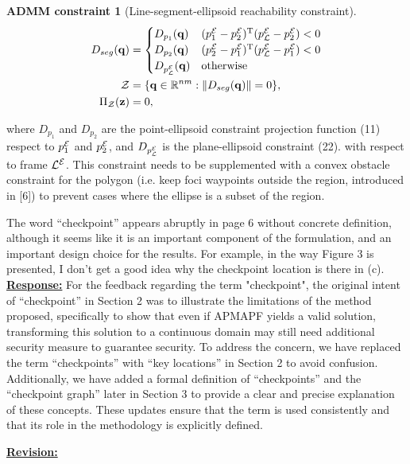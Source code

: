 \documentclass{article}
\newtheorem{constraint}{ADMM constraint}
\newcommand{\re}{\tcblower \underline{\textbf{Response:}}\quad}
\newcommand{\rv}{{\large{\underline{\textbf{Revision:}}}}\quad}
\begin{document}
{\begin{constraint}[Line-segment-ellipsoid reachability constraint]
\begin{align}
D_{seg}(\mathbf{q}) &=  \begin{cases}
D_{p_{1}}(\mathbf{q}) & ({p_1^{\mathcal{E}}}-{p_2^{\mathcal{E}}})^\mathrm{T} ({p_{\mathcal{L}}^{\mathcal{E}}}-{p_2^{\mathcal{E}}})<0\\
D_{p_{2}}(\mathbf{q}) & ({p_2^{\mathcal{E}}}-{p_1^{\mathcal{E}}})^\mathrm{T} ({p_{\mathcal{L}}^{\mathcal{E}}} -{p_1^{\mathcal{E}}})<0\\
D_{p_{\mathcal{L}}^{\mathcal{E}}}(\mathbf{q}) & \textrm{otherwise}
\end{cases} \label{eq:segment_ellipsoid_constraint}\\
  \mathcal{Z} &= \{\mathbf{q}\in\mathbb{R}^{nm}:\lVert D_{seg}(\mathbf{q})\rVert = 0 \},\\
   \Pi_{\mathcal{Z}}(\mathbf{z}) & = 0, 
\end{align}
\end{constraint}
where $D_{p_{1}}$ and $D_{p_{2}}$ are the point-ellipsoid constraint projection function (11) respect to ${p_{1}^{\mathcal{E}}}$ and ${p_{2}^{\mathcal{E}}}$, and $D_{p_{\mathcal{L}}^{\mathcal{E}}}$ is the plane-ellipsoid constraint (22). with respect to frame ${\mathcal{L}^{\mathcal{E}}}$.
This constraint needs to be supplemented with a convex obstacle constraint for the polygon (i.e. keep foci waypoints outside the region, introduced in [6]) to prevent cases where the ellipse is a subset of the region.
}

\vspace{0.2cm}
\begin{cmt}{}{}
	The word “checkpoint” appears abruptly in page 6 without concrete
	definition, although it seems like it is an important component of the
	formulation, and an important design choice for the results. For
	example, in the way Figure 3 is presented, I don't get a good idea why
	the checkpoint location is there in (c). 
	\re 
	\noindent
 For the feedback regarding the term "checkpoint", the original intent of “checkpoint” in Section 2 was to illustrate the limitations of the method proposed, specifically to show that even if APMAPF yields a valid solution, transforming this solution to a continuous domain may still need additional security measure to guarantee security. To address the concern, we have replaced the term “checkpoints” with “key locations” in Section 2 to avoid confusion. Additionally, we have added a formal definition of “checkpoints” and the “checkpoint graph” later in Section 3 to provide a clear and precise explanation of these concepts. These updates ensure that the term is used consistently and that its role in the methodology is explicitly defined. 
\end{cmt}
\rv
\renewcommand\thesubsection{H}
\end{document}
